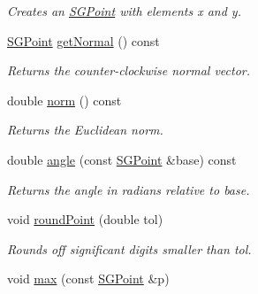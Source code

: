 \begin{DoxyCompactItemize}
\begin{DoxyCompactList}\small\item\em Creates an \hyperlink{classSGPoint}{S\-G\-Point} with elements x and y. \end{DoxyCompactList}\item 
\hypertarget{classSGPoint_a9afd46314dd53db086df54be5ebc0a56}{\hyperlink{classSGPoint}{S\-G\-Point} \hyperlink{classSGPoint_a9afd46314dd53db086df54be5ebc0a56}{get\-Normal} () const }\label{classSGPoint_a9afd46314dd53db086df54be5ebc0a56}

\begin{DoxyCompactList}\small\item\em Returns the counter-\/clockwise normal vector. \end{DoxyCompactList}\item 
\hypertarget{classSGPoint_a687f18f1e1eaa27ac14806d76c69b6c0}{double \hyperlink{classSGPoint_a687f18f1e1eaa27ac14806d76c69b6c0}{norm} () const }\label{classSGPoint_a687f18f1e1eaa27ac14806d76c69b6c0}

\begin{DoxyCompactList}\small\item\em Returns the Euclidean norm. \end{DoxyCompactList}\item 
\hypertarget{classSGPoint_aa58461a5362b199cc0c6827f6e2c539c}{double \hyperlink{classSGPoint_aa58461a5362b199cc0c6827f6e2c539c}{angle} (const \hyperlink{classSGPoint}{S\-G\-Point} \&base) const }\label{classSGPoint_aa58461a5362b199cc0c6827f6e2c539c}

\begin{DoxyCompactList}\small\item\em Returns the angle in radians relative to base. \end{DoxyCompactList}\item 
\hypertarget{classSGPoint_a0eaedf1dcee422b6c31037e9fc5a42c0}{void \hyperlink{classSGPoint_a0eaedf1dcee422b6c31037e9fc5a42c0}{round\-Point} (double tol)}\label{classSGPoint_a0eaedf1dcee422b6c31037e9fc5a42c0}

\begin{DoxyCompactList}\small\item\em Rounds off significant digits smaller than tol. \end{DoxyCompactList}\item 
\hypertarget{classSGPoint_aa1de2bc64f504756f62f3a27e15a07c7}{void \hyperlink{classSGPoint_aa1de2bc64f504756f62f3a27e15a07c7}{max} (const \hyperlink{classSGPoint}{S\-G\-Point} \&p)}\label{classSGPoint_aa1de2bc64f504756f62f3a27e15a07c7}


\end{DoxyCompactItemize}
